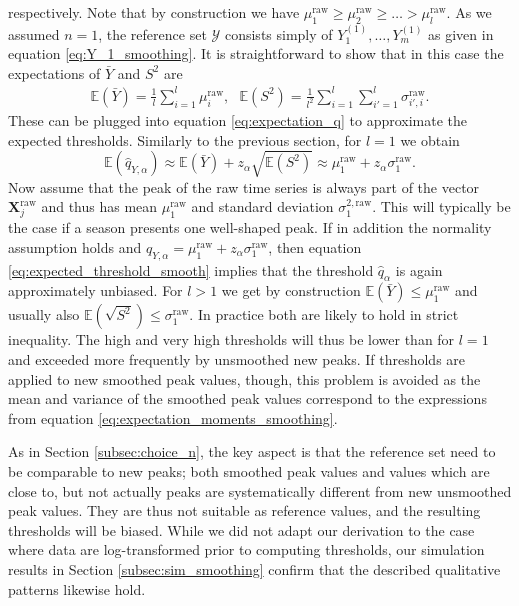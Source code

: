 \documentclass{article}
\begin{document}
respectively. Note that by construction we have $\mu^\text{raw}_1 \geq \mu^\text{raw}_2 \geq \dots > \mu^\text{raw}_l$. As we assumed $n = 1$, the reference set $\mathcal{Y}$ consists simply of $Y^{(1)}_1, \dots, Y^{(1)}_m$ as given in equation \eqref{eq:Y_1_smoothing}. It is straightforward to show that in this case the expectations of $\bar{Y}$ and $S^2$ are
\begin{align}
\mathbb{E}(\bar{Y}) = \frac{1}{l} \sum_{i = 1}^l \mu^\text{raw}_i, \ \ \ 
\mathbb{E}(S^2) = \frac{1}{l^2} \sum_{i = 1}^l \sum_{i' = 1}^l \sigma^\text{raw}_{i', i}.
\label{eq:expectation_moments_smoothing}
\end{align}
These can be plugged into equation \eqref{eq:expectation_q} to approximate the expected thresholds. Similarly to the previous section, for $l = 1$ we obtain
\begin{equation}
\mathbb{E}(\hat{q}_{Y, \alpha}) \approx \mathbb{E}(\bar{Y}) + z_\alpha \sqrt{\mathbb{E}(S^2)} \approx \mu^\text{raw}_1 + z_\alpha \sigma^\text{raw}_1.
\label{eq:expected_threshold_smooth}
\end{equation}
Now assume that the peak of the raw time series is always part of the vector $\mathbf{X}_j^\text{raw}$ and thus has mean $\mu^\text{raw}_1$ and standard deviation $\sigma^{2, \text{raw}}_1$. This will typically be the case if a season presents one well-shaped peak. If in addition the normality assumption holds and $q_{Y, \alpha} = \mu_1^\text{raw} + z_\alpha \sigma_1^\text{raw}$, then equation \eqref{eq:expected_threshold_smooth} implies that the threshold $\hat{q}_\alpha$ is again approximately unbiased. %
For $l > 1$ we get by construction $\mathbb{E}(\bar{Y}) \leq \mu^\text{raw}_1$ and usually also $\mathbb{E}(\sqrt{S^2}) \leq \sigma^\text{raw}_1$. In practice both are likely to hold in strict inequality. The high and very high thresholds will thus be lower than for $l = 1$ and exceeded more frequently by unsmoothed new peaks. If thresholds are applied to new smoothed peak values, though, this problem is avoided as the mean and variance of the smoothed peak values correspond to the expressions from equation \eqref{eq:expectation_moments_smoothing}.

As in Section \ref{subsec:choice_n}, the key aspect is that the reference set need to be comparable to new peaks; both smoothed peak values and values which are close to, but not actually peaks are systematically different from new unsmoothed peak values. They are thus not suitable as reference values, and the resulting thresholds will be biased. While we did not adapt our derivation to the case where data are log-transformed prior to computing thresholds, our simulation results in Section \ref{subsec:sim_smoothing} confirm that the described qualitative patterns likewise hold.
\end{document}
